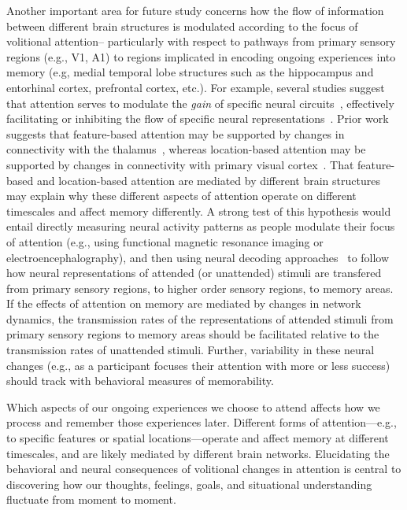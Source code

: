 \documentclass[english]{article}
\begin{document}
Another important area for future study concerns how the flow of information
between different brain structures is modulated according to the focus of
volitional attention-- particularly with respect to pathways from primary
sensory regions (e.g., V1, A1) to regions implicated in encoding ongoing
experiences into memory (e.g, medial temporal lobe structures such as the
hippocampus and entorhinal cortex, prefrontal cortex, etc.). For example,
several studies suggest that attention serves to modulate the \textit{gain} of
specific neural circuits~\citep{TreuTruj99, ChanEtal02, EldaEtal13,
SaliThie00}, effectively facilitating or inhibiting the flow of specific neural
representations~\citep{VartEtal07, LaRoEtal14}. Prior work suggests that
feature-based attention may be supported by changes in connectivity with the
thalamus~\citep{Schn11}, whereas location-based attention may be supported by
changes in connectivity with primary visual cortex~\citep{NoudEtal10}. That
feature-based and location-based attention are mediated by different brain
structures may explain why these different aspects of attention operate on
different timescales and affect memory differently. A strong test of this
hypothesis would entail directly measuring neural activity patterns as people
modulate their focus of attention (e.g., using functional magnetic resonance
imaging or electroencephalography), and then using neural decoding
approaches~\citep[e.g.,][]{HaxbEtal01, NormEtal06b, MannEtal18} to follow how
neural representations of attended (or unattended) stimuli are transfered from
primary sensory regions, to higher order sensory regions, to memory areas. If
the effects of attention on memory are mediated by changes in network dynamics,
the transmission rates of the representations of attended stimuli from primary
sensory regions to memory areas should be facilitated relative to the
transmission rates of unattended stimuli. Further, variability in these neural
changes (e.g., as a participant focuses their attention with more or less
success) should track with behavioral measures of memorability.

Which aspects of our ongoing experiences we choose to attend affects how we
process and remember those experiences later. Different forms of
attention---e.g., to specific features or spatial locations---operate and
affect memory at different timescales, and are likely mediated by different
brain networks. Elucidating the behavioral and neural consequences of
volitional changes in attention is central to discovering how our thoughts,
feelings, goals, and situational understanding fluctuate from moment to moment.
\end{document}
